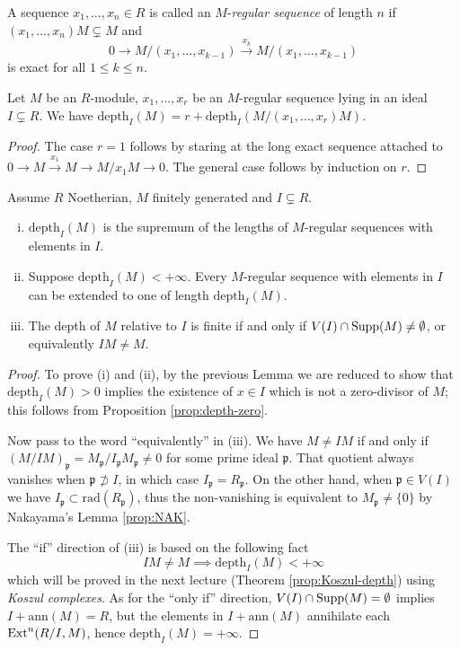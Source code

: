 \begin{definition}
	A sequence $x_1, \ldots, x_n \in R$ is called an $M$-\emph{regular sequence} of length $n$ if $(x_1, \ldots, x_n)M \subsetneq M$ and
	\[ 0 \to M/(x_1, \ldots, x_{k-1}) \xrightarrow{x_k} M/(x_1, \ldots, x_{k-1}) \]
	is exact for all $1 \leq k \leq n$.
\end{definition}

\begin{lemma}
	Let $M$ be an $R$-module, $x_1, \ldots, x_r$ be an $M$-regular sequence lying in an ideal $I \subsetneq R$. We have $\mathrm{depth}_I(M) = r + \mathrm{depth}_I(M/(x_1, \ldots, x_r)M)$.
\end{lemma}
\begin{proof}
	The case $r=1$ follows by staring at the long exact sequence attached to $0 \to M \xrightarrow{x_1} M \to M/x_1 M \to 0$. The general case follows by induction on $r$.
\end{proof}

\begin{theorem}\label{prop:regular-vs-depth}
	Assume $R$ Noetherian, $M$ finitely generated and $I \subsetneq R$.
	\begin{enumerate}[(i)]
		\item $\mathrm{depth}_I(M)$ is the supremum of the lengths of $M$-regular sequences with elements in $I$.
		\item Suppose $\mathrm{depth}_I(M) < +\infty$. Every $M$-regular sequence with elements in $I$ can be extended to one of length $\mathrm{depth}_I(M)$.
		\item The depth of $M$ relative to $I$ is finite if and only if $V(I) \cap \operatorname{Supp}(M) \neq \emptyset$, or equivalently $IM \neq M$.
	\end{enumerate}
\end{theorem}
\begin{proof}
	To prove (i) and (ii), by the previous Lemma we are reduced to show that $\text{depth}_I(M) > 0$ implies the existence of $x \in I$ which is not a zero-divisor of $M$; this follows from Proposition \ref{prop:depth-zero}.
	
	Now pass to the word ``equivalently'' in (iii). We have $M \neq IM$ if and only if $(M/IM)_{\mathfrak{p}} = M_{\mathfrak{p}}/ I_{\mathfrak{p}} M_{\mathfrak{p}} \neq 0$ for some prime ideal $\mathfrak{p}$. That quotient always vanishes when $\mathfrak{p} \not\supset I$, in which case $I_{\mathfrak{p}} = R_{\mathfrak{p}}$. On the other hand, when $\mathfrak{p} \in V(I)$ we have $I_{\mathfrak{p}} \subset \text{rad}(R_{\mathfrak{p}})$, thus the non-vanishing is equivalent to $M_{\mathfrak{p}} \neq \{0\}$ by Nakayama's Lemma \ref{prop:NAK}.
	
	The ``if'' direction of (iii) is based on the following fact
	\[ IM \neq M \implies \text{depth}_I(M) < +\infty \]
	which will be proved in the next lecture (Theorem \ref{prop:Koszul-depth}) using \emph{Koszul complexes}. As for the ``only if'' direction, $V(I) \cap \operatorname{Supp}(M) = \emptyset$ implies $I + \text{ann}(M) = R$, but the elements in $I + \text{ann}(M)$ annihilate each $\operatorname{Ext}^n(R/I, M)$, hence $\text{depth}_I(M)=+\infty$.
\end{proof}

